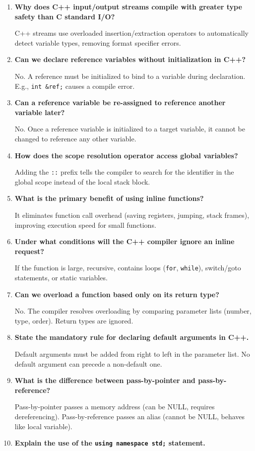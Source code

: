 \documentclass[12pt,a4paper]{article}
\newcommand{\Q}[1]{\textbf{#1}\par\noindent\ignorespaces}
\begin{document}
\begin{tcolorbox}[exambox, title={\textbf{Frequently Asked / Viva Questions}}]
\begin{enumerate}[topsep=0pt, label=\textbf{Q\arabic*.}, itemsep=5pt]
  \item \Q{Why does C++ input/output streams compile with greater type safety than C standard I/O?}
    C++ streams use overloaded insertion/extraction operators to automatically detect variable types, removing format specifier errors.
  \item \Q{Can we declare reference variables without initialization in C++?}
    No. A reference must be initialized to bind to a variable during declaration. E.g., \texttt{int \&ref;} causes a compile error.
  \item \Q{Can a reference variable be re-assigned to reference another variable later?}
    No. Once a reference variable is initialized to a target variable, it cannot be changed to reference any other variable.
  \item \Q{How does the scope resolution operator access global variables?}
    Adding the \texttt{::} prefix tells the compiler to search for the identifier in the global scope instead of the local stack block.
  \item \Q{What is the primary benefit of using inline functions?}
    It eliminates function call overhead (saving registers, jumping, stack frames), improving execution speed for small functions.
  \item \Q{Under what conditions will the C++ compiler ignore an inline request?}
    If the function is large, recursive, contains loops (\texttt{for}, \texttt{while}), switch/goto statements, or static variables.
  \item \Q{Can we overload a function based only on its return type?}
    No. The compiler resolves overloading by comparing parameter lists (number, type, order). Return types are ignored.
  \item \Q{State the mandatory rule for declaring default arguments in C++.}
    Default arguments must be added from right to left in the parameter list. No default argument can precede a non-default one.
  \item \Q{What is the difference between pass-by-pointer and pass-by-reference?}
    Pass-by-pointer passes a memory address (can be NULL, requires dereferencing). Pass-by-reference passes an alias (cannot be NULL, behaves like local variable).
  \item \Q{Explain the use of the \texttt{using namespace std;} statement.}

\end{enumerate}
\end{tcolorbox}
\end{document}
